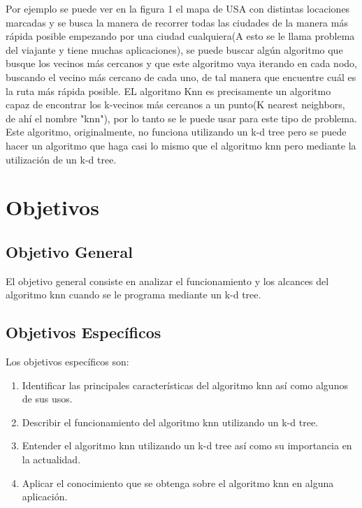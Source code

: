 \documentclass[letterpaper]{article}
\begin{document}
Por ejemplo se puede ver en la figura 1 el mapa de USA con distintas locaciones marcadas y se busca la manera de recorrer todas las ciudades de la manera más rápida posible empezando por una ciudad cualquiera(A esto se le llama problema del viajante y tiene muchas aplicaciones), se puede buscar algún algoritmo que busque los vecinos más cercanos y que este algoritmo vaya iterando en cada nodo, buscando el vecino más cercano de cada uno, de tal manera que encuentre cuál es la ruta más rápida posible.  EL algoritmo Knn es precisamente un algoritmo capaz de encontrar los k-vecinos más cercanos a un punto(K nearest neighbors, de ahí el nombre "knn"), por lo tanto se le puede usar para este tipo de problema. Este algoritmo, originalmente, no funciona utilizando un k-d tree pero se puede hacer un algoritmo que haga casi lo mismo que el algoritmo knn pero mediante la utilización de un k-d tree. 
\section{Objetivos}

\subsection{Objetivo General}

El objetivo general consiste en analizar el funcionamiento y los alcances del algoritmo knn cuando se le programa mediante un k-d tree.\\

\subsection{Objetivos Específicos}

Los objetivos específicos son:\\
\begin{enumerate}
\item Identificar las principales características del algoritmo knn así como algunos de sus usos.
\item Describir el funcionamiento del algoritmo knn utilizando un k-d tree.
\item Entender el algoritmo knn utilizando un k-d tree así como su importancia en la actualidad.
\item Aplicar el conocimiento que se obtenga sobre el algoritmo knn en alguna aplicación.
\end{enumerate}
\end{document}

